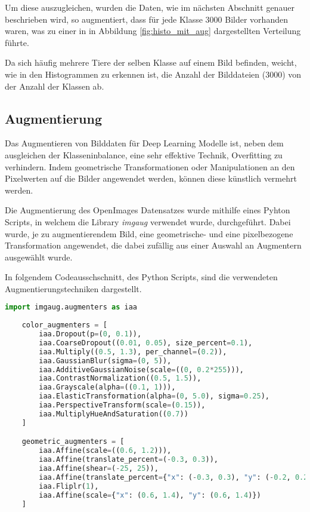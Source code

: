 Um diese auszugleichen, wurden die Daten, wie im nächsten
Abschnitt genauer beschrieben wird, so augmentiert, 
dass für jede Klasse 3000 Bilder vorhanden waren, was zu einer in 
in Abbildung \ref{fig:histo_mit_aug} 
dargestellten Verteilung führte.

Da sich häufig mehrere Tiere der selben Klasse 
auf einem Bild befinden, weicht, wie in den Histogrammen 
zu erkennen ist, die Anzahl der Bilddateien (3000) von 
der Anzahl der Klassen ab.



\subsection{Augmentierung}\label{subsec:augmentation}

Das Augmentieren von Bilddaten für Deep Learning Modelle
ist, neben dem ausgleichen der Klasseninbalance, eine sehr
effektive Technik, Overfitting zu verhindern.
Indem geometrische Transformationen oder Manipulationen 
an den Pixelwerten auf die Bilder angewendet werden, 
können diese künstlich vermehrt werden.

Die Augmentierung des OpenImages Datensatzes wurde mithilfe 
eines Pyhton Scripts, in welchem die Library 
\textit{imgaug} \cite{imgaug} verwendet wurde, durchgeführt.
Dabei wurde, je zu augmentierendem Bild, eine geometrische- und 
eine pixelbezogene Transformation angewendet, die dabei 
zufällig aus einer Auswahl an Augmentern ausgewählt wurde.

In folgendem Codeausschschnitt, des Python Scripts, sind die 
verwendeten Augmentierungstechniken dargestellt.

\begin{lstlisting}[language=Python]
    import imgaug.augmenters as iaa
    
    color_augmenters = [
        iaa.Dropout(p=(0, 0.1)),
        iaa.CoarseDropout((0.01, 0.05), size_percent=0.1),
        iaa.Multiply((0.5, 1.3), per_channel=(0.2)),
        iaa.GaussianBlur(sigma=(0, 5)),
        iaa.AdditiveGaussianNoise(scale=((0, 0.2*255))),
        iaa.ContrastNormalization((0.5, 1.5)),
        iaa.Grayscale(alpha=((0.1, 1))),
        iaa.ElasticTransformation(alpha=(0, 5.0), sigma=0.25),
        iaa.PerspectiveTransform(scale=(0.15)),
        iaa.MultiplyHueAndSaturation((0.7))
    ]

    geometric_augmenters = [
        iaa.Affine(scale=((0.6, 1.2))),
        iaa.Affine(translate_percent=(-0.3, 0.3)),
        iaa.Affine(shear=(-25, 25)),
        iaa.Affine(translate_percent={"x": (-0.3, 0.3), "y": (-0.2, 0.2)}),
        iaa.Fliplr(1),
        iaa.Affine(scale={"x": (0.6, 1.4), "y": (0.6, 1.4)})
    ]
    
\end{lstlisting}

